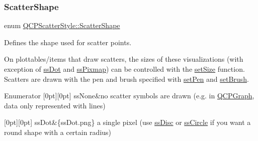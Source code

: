 \subsubsection{\texorpdfstring{Scatter\+Shape}{ScatterShape}\hspace{0.1cm}{\footnotesize\ttfamily [1/2]}}
{\footnotesize\ttfamily enum \hyperlink{class_q_c_p_scatter_style_adb31525af6b680e6f1b7472e43859349}{Q\+C\+P\+Scatter\+Style\+::\+Scatter\+Shape}}

Defines the shape used for scatter points.

On plottables/items that draw scatters, the sizes of these visualizations (with exception of \hyperlink{class_q_c_p_scatter_style_adb31525af6b680e6f1b7472e43859349a456cf4e531ea7efd2affcf19c434f6ec}{ss\+Dot} and \hyperlink{class_q_c_p_scatter_style_adb31525af6b680e6f1b7472e43859349a0e709ca8b00ac857a65459d63cc94521}{ss\+Pixmap}) can be controlled with the \hyperlink{class_q_c_p_scatter_style_aaefdd031052892c4136129db68596e0f}{set\+Size} function. Scatters are drawn with the pen and brush specified with \hyperlink{class_q_c_p_scatter_style_a761f1f229cc0ca4703e1e2b89f6dd1ba}{set\+Pen} and \hyperlink{class_q_c_p_scatter_style_a74d692aaeb8d4b36d6f7d510e44264b1}{set\+Brush}. \begin{DoxyEnumFields}{Enumerator}
[0pt][0pt]{}\mbox{\label{class_q_c_p_scatter_style_adb31525af6b680e6f1b7472e43859349a4a706d6879ec5c34643446db00469b33}} 
ss\+None&no scatter symbols are drawn (e.\+g. in \hyperlink{class_q_c_p_graph}{Q\+C\+P\+Graph}, data only represented with lines) \\
\hline

[0pt][0pt]{}\mbox{\label{class_q_c_p_scatter_style_adb31525af6b680e6f1b7472e43859349a456cf4e531ea7efd2affcf19c434f6ec}} 
ss\+Dot&\{ss\+Dot.\+png\} a single pixel (use \hyperlink{class_q_c_p_scatter_style_adb31525af6b680e6f1b7472e43859349afc3b57bea21b577758a587f1c50f53ef}{ss\+Disc} or \hyperlink{class_q_c_p_scatter_style_adb31525af6b680e6f1b7472e43859349a684701e478e9815965c9a92e97dec04a}{ss\+Circle} if you want a round shape with a certain radius) \\
\hline


\end{DoxyEnumFields}
